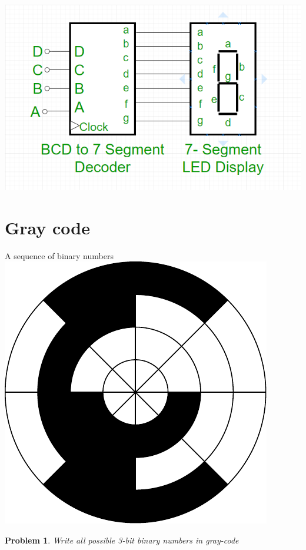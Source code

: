 \documentclass{article}
\newtheorem{prob}{Problem}
\begin{document}
\includegraphics[width=0.5\linewidth]{bcdto7seg.png}

\section{Gray code}
A sequence of binary numbers 
\includegraphics[width=0.5\linewidth]{gray-code.pdf}

\begin{prob}
  Write all possible 3-bit binary numbers in gray-code
\end{prob}
\vspace{10em}

%
%
\end{document}
